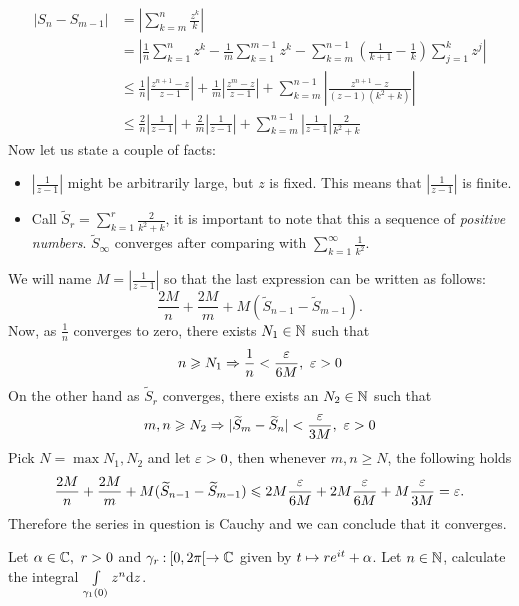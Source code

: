 \documentclass[12pt]{memoir}
\begin{document}
\begin{ptcbr}
\begin{enumerate}[i)]
        \begin{align*}
            |S_n-S_{m-1}|&=\left|\sum_{k=m}^n\frac{z^k}{k}\right|\\
            &=\left|\frac{1}{n}\sum_{k=1}^nz^k-\frac{1}{m}\sum_{k=1}^{m-1}z^k-\sum_{k=m}^{n-1}\left(\frac{1}{k+1}-\frac1k\right)\sum_{j=1}^k z^j\right|\\
            &\leq \frac{1}{n}\left|\frac{z^{n+1}-z}{z-1}\right|+\frac{1}{m}\left|\frac{z^{m}-z}{z-1}\right|+\sum_{k=m}^{n-1}\left|\frac{z^{n+1}-z}{(z-1)(k^2+k)}\right|\\
            &\leq \frac{2}{n}\left|\frac{1}{z-1}\right|+\frac{2}{m}\left|\frac{1}{z-1}\right|+\sum_{k=m}^{n-1}\left|\frac{1}{z-1}\right|\frac{2}{k^2+k}
        \end{align*}
        Now let us state a couple of facts:
        \begin{itemize}
            \item $\left|\frac{1}{z-1}\right|$ might be arbitrarily large, but $z$ is fixed. This means that $\left|\frac{1}{z-1}\right|$ is finite.
            \item Call $\widetilde{S}_r=\sum_{k=1}^{r}\frac{2}{k^2+k}$, it is important to note that this a sequence of \emph{positive numbers}. $\widetilde{S}_\infty$ converges after comparing with $\sum_{k=1}^\infty\frac{1}{k^2}$.
        \end{itemize}
        We will name $M=\left|\frac{1}{z-1}\right|$ so that the last expression can be written as follows:
        $$\frac{2M}{n}+\frac{2M}{m}+M(\widetilde{S}_{n-1}-\widetilde{S}_{m-1}).$$
        Now, as $\frac{1}{n}$ converges to zero, there exists $N_1\in\mathbb{N}$ such that 
        $$n\geq N_1\To \frac{1}{n}<\frac{\eps}{6M},\ \eps>0$$
        On the other hand as $\widetilde{S}_r$ converges, there exists an $N_2\in\mathbb{N}$ such that 
        $$m,n\geq N_2\To |\widetilde{S}_m-\widetilde{S}_n|<\frac{\eps}{3M},\ \eps>0$$
        Pick $N=\max{N_1,N_2}$ and let $\varepsilon>0$, then whenever $m,n\geq N$, the following holds 
        $$\frac{2M}{n}+\frac{2M}{m}+M(\widetilde{S}_{n-1}-\widetilde{S}_{m-1})\leqslant 2M\frac{\varepsilon}{6M}+2M\frac{\varepsilon}{6M}+M\frac{\varepsilon}{3M}=\varepsilon.$$
        Therefore the series in question is Cauchy and we can conclude that it converges.
    \end{enumerate}
\end{ptcbr}
\begin{Ej}
    Let $\alpha\in\mathbb{C},\ r>0$ and $\gamma_r\mathbin{:} [0,2\pi[\to\mathbb{C}$ given by $t\mapsto re^{it}+\alpha$. Let $n\in\mathbb{N}$, calculate the integral $\int\limits_{\gamma_1(0)}z^n\dd z$.
\end{Ej}
\end{document}
